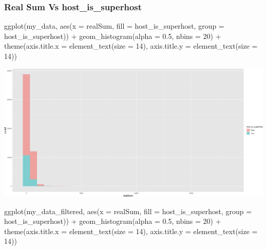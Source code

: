 \documentclass[
]{article}
\newenvironment{Shaded}{\begin{snugshade}}{\end{snugshade}}
\newcommand{\AttributeTok}[1]{\textcolor[rgb]{0.77,0.63,0.00}{#1}}
\newcommand{\DecValTok}[1]{\textcolor[rgb]{0.00,0.00,0.81}{#1}}
\newcommand{\FloatTok}[1]{\textcolor[rgb]{0.00,0.00,0.81}{#1}}
\newcommand{\FunctionTok}[1]{\textcolor[rgb]{0.00,0.00,0.00}{#1}}
\newcommand{\NormalTok}[1]{#1}
\newcommand{\SpecialCharTok}[1]{\textcolor[rgb]{0.00,0.00,0.00}{#1}}
\begin{document}
\hypertarget{real-sum-vs-host_is_superhost}{%
\subsubsection{Real Sum Vs
host\_is\_superhost}\label{real-sum-vs-host_is_superhost}}

\begin{Shaded}
\begin{Highlighting}[]
\FunctionTok{ggplot}\NormalTok{(my\_data, }\FunctionTok{aes}\NormalTok{(}\AttributeTok{x =}\NormalTok{ realSum, }\AttributeTok{fill =}\NormalTok{ host\_is\_superhost, }\AttributeTok{group =}\NormalTok{ host\_is\_superhost)) }\SpecialCharTok{+}
    \FunctionTok{geom\_histogram}\NormalTok{(}\AttributeTok{alpha =} \FloatTok{0.5}\NormalTok{, }\AttributeTok{nbins =} \DecValTok{20}\NormalTok{) }\SpecialCharTok{+} \FunctionTok{theme}\NormalTok{(}\AttributeTok{axis.title.x =} \FunctionTok{element\_text}\NormalTok{(}\AttributeTok{size =} \DecValTok{14}\NormalTok{),}
    \AttributeTok{axis.title.y =} \FunctionTok{element\_text}\NormalTok{(}\AttributeTok{size =} \DecValTok{14}\NormalTok{))}
\end{Highlighting}
\end{Shaded}

\includegraphics{Project_files/figure-latex/unnamed-chunk-20-1.png}

\begin{Shaded}
\begin{Highlighting}[]
\FunctionTok{ggplot}\NormalTok{(my\_data\_filtered, }\FunctionTok{aes}\NormalTok{(}\AttributeTok{x =}\NormalTok{ realSum, }\AttributeTok{fill =}\NormalTok{ host\_is\_superhost,}
    \AttributeTok{group =}\NormalTok{ host\_is\_superhost)) }\SpecialCharTok{+} \FunctionTok{geom\_histogram}\NormalTok{(}\AttributeTok{alpha =} \FloatTok{0.5}\NormalTok{,}
    \AttributeTok{nbins =} \DecValTok{20}\NormalTok{) }\SpecialCharTok{+} \FunctionTok{theme}\NormalTok{(}\AttributeTok{axis.title.x =} \FunctionTok{element\_text}\NormalTok{(}\AttributeTok{size =} \DecValTok{14}\NormalTok{),}
    \AttributeTok{axis.title.y =} \FunctionTok{element\_text}\NormalTok{(}\AttributeTok{size =} \DecValTok{14}\NormalTok{))}
\end{Highlighting}
\end{Shaded}
\end{document}
